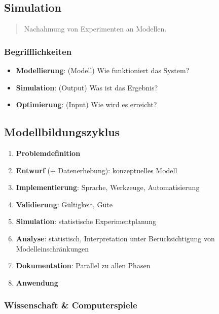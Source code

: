 \documentclass{article}
\begin{document}
\subsection{Simulation}
\begin{quote}Nachahmung von Experimenten an Modellen.\end{quote}



\subsubsection{Begrifflichkeiten}
\begin{itemize}
  \item \textbf{Modellierung}: (Modell) Wie funktioniert das System?
  \item \textbf{Simulation}: (Output) Was ist das Ergebnis?
  \item \textbf{Optimierung}: (Input) Wie wird es erreicht?
\end{itemize}

\subsection{Modellbildungszyklus}
\begin{enumerate}
  \item \textbf{Problemdefinition}
  \item \textbf{Entwurf} (+ Datenerhebung): konzeptuelles Modell
  \item \textbf{Implementierung}: Sprache, Werkzeuge, Automatisierung
  \item \textbf{Validierung}: Gültigkeit, Güte
  \item \textbf{Simulation}: statistische Experimentplanung
  \item \textbf{Analyse}: statistisch, Interpretation unter Berücksichtigung von Modelleinschränkungen
  \item \textbf{Dokumentation}: Parallel zu allen Phasen
  \item \textbf{Anwendung}
\end{enumerate}

\subsubsection{Wissenschaft \& Computerspiele}

\end{document}
